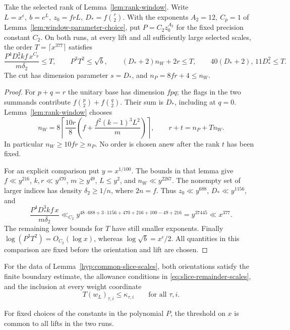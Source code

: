 \begin{established}
\label{hyp:common-slice-scales}\label{par:slice-scales}
\hypertarget{source-slice-scales}{}
Take the selected rank of Lemma~\ref{lem:rank-window}. Write
\(L=x^\epsilon,\ b=e^L,\ z_0=frL,\ D_*=f\binom r2\).
With the exponents \(A_2=12,\ C_p=1\) of
Lemma~\ref{lem:window-parameter-choice}, put \(P=C_2z_0^{A_2}\)
for the fixed precision constant \(C_2\). On both runs, at every lift
and all sufficiently large selected scales, the order \(T=\lceil
x^{377}\rceil\) satisfies
\[
 \frac{P^4D_*^3kf\,x^{C_p}}{m\delta_2}\le T,\qquad
 P^3T^2\le\sqrt b,\qquad
 (D_*+2)n_W+2r\le T,\qquad 40(D_*+2),\,11D_*^2\le T .
\]
The cut has dimension parameter \(s=D_*\), and
\(n_P=8fr+4\le n_W\).
\label{cor:slice-scales-1}
\end{established}
\begin{proof}
For \(p+q=r\) the unitary base has dimension \(fpq\); the flags in
the two summands contribute \(f\binom p2+f\binom q2\).
Their sum is \(D_*\), including at \(q=0\).
Lemma~\ref{lem:rank-window} chooses
\[
 n_W=8\left\lceil\frac{10r}8
         \left(f+\frac{f^2(k-1)^3L^2}{m}\right)\right\rceil,
 \qquad r+t=n_P+Tn_W .
\]
In particular \(n_W\ge10fr\ge n_P\). No order is chosen anew after
the rank \(t\) has been fixed.

For an explicit comparison put \(y=x^{1/100}\). The bounds in that
lemma give \(f\ll y^{216}\), \(k,r\ll y^{470}\), \(m\ge y^{49}\),
\(L\le y^2\), and \(n_W\ll y^{2267}\). The nonempty set of larger
indices has density \(\delta_2\ge 1/n\), where \(2n=f\). Thus
\(z_0\ll y^{688}\), \(D_*\ll y^{1156}\), and
\[
 \frac{P^4D_*^3kf\,x}{m\delta_2}
 \ll_{C_2} y^{48\cdot688+3\cdot1156+470+216+100-49+216}
 =y^{37445}\ll x^{377}.
\]
The remaining lower bounds for \(T\) have still smaller exponents.
Finally \(\log(P^3T^2)=O_{C_2}(\log x)\), whereas
\(\log\sqrt b=x^\epsilon/2\). All quantities in this comparison are
fixed before the orientation and lift are chosen.
\end{proof}

\begin{lemma}
\label{lem:common-slice-scales}
For the data of Lemma~\ref{hyp:common-slice-scales}, both orientations satisfy the finite boundary estimate, the allowance conditions in \eqref{eq:slice-remainder-scales}, and the inclusion at every weight coordinate
\[
 T(w_L)_{\tau,i}\le\kappa_{\tau,i}\qquad\text{for all }\tau,i.
\]

For fixed choices of the constants in the polynomial \(P\), the
threshold on \(x\) is common to all lifts in the two runs.
\end{lemma}

